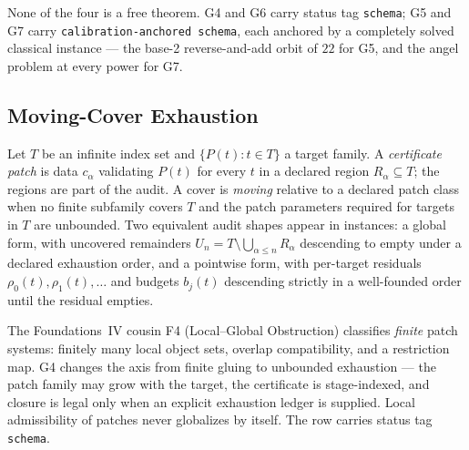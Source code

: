 \documentclass[11pt]{article}
\newcommand{\lawGFour}{Moving-Cover Exhaustion}
\theoremstyle{definition}
\begin{document}
None of the four is a free theorem. G4 and G6 carry status tag \texttt{schema}; G5 and G7 carry
\texttt{calibration-anchored schema}, each anchored by a completely solved classical instance --- the
base-2 reverse-and-add orbit of $22$ for G5, and the angel problem at every power for G7.

\subsection{\lawGFour}\label{sec:clusterB:g4}

Let $T$ be an infinite index set and $\{P(t) : t \in T\}$ a target family. A \emph{certificate patch}
is data $c_\alpha$ validating $P(t)$ for every $t$ in a declared region $R_\alpha \subseteq T$; the
regions are part of the audit. A cover is \emph{moving} relative to a declared patch class when no
finite subfamily covers $T$ and the patch parameters required for targets in $T$ are unbounded. Two
equivalent audit shapes appear in instances: a global form, with uncovered remainders
$U_n = T \setminus \bigcup_{\alpha \le n} R_\alpha$ descending to empty under a declared exhaustion
order, and a pointwise form, with per-target residuals $\rho_0(t), \rho_1(t), \ldots$ and budgets
$b_j(t)$ descending strictly in a well-founded order until the residual empties.

The Foundations~IV cousin F4 (Local--Global Obstruction) classifies \emph{finite} patch systems:
finitely many local object sets, overlap compatibility, and a restriction map. G4 changes the axis
from finite gluing to unbounded exhaustion --- the patch family may grow with the target, the
certificate is stage-indexed, and closure is legal only when an explicit exhaustion ledger is
supplied. Local admissibility of patches never globalizes by itself. The row carries status tag
\texttt{schema}.
\end{document}

